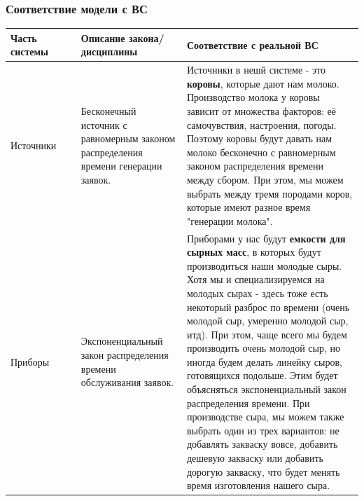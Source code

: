 \documentclass[a4paper, 14pt]{article}
\begin{document}
\subsubsection{Соответствие модели с ВС}

\begin{center}
	\begin{tabular}{|p{0.2\linewidth} | p{0.3\linewidth}| p{0.5\linewidth}|}
		\hline
		Часть системы      & Описание закона/дисциплины                                                           & Соответствие с реальной ВС                                                                                                                                                                                                                                                                                                                                                                                                                                                                                                                                                                                                                                     \\
		\hline
		Источники          & Бесконечный источник с равномерным законом распределения времени генерации заявок.   & Источники в нешй системе - это \textbf{коровы}, которые дают нам молоко. Производство молока у коровы зависит от множества факторов: её самочувствия, настроения, погоды. Поэтому коровы будут давать нам молоко бесконечно с равномерным законом распределения времени между сбором. При этом, мы можем выбрать между тремя породами коров, которые имеют разное время "генерации молока".                                                                                                                                                                                                                                                                    \\
		\hline
		Приборы            & Экспоненциальный закон распределения времени обслуживания заявок.                    & Приборами у нас будут \textbf{емкости для сырных масс}, в которых будут производиться наши молодые сыры. Хотя мы и специализируемся на молодых сырах - здесь тоже есть некоторый разброс по времени (очень молодой сыр, умеренно молодой сыр, итд). При этом, чаще всего мы будем производить очень молодой сыр, но иногда будем делать линейку сыров, готовящихся подольше. Этим будет объясняться экспоненциальный закон распределения времени. При производстве сыра, мы можем также выбрать один из трех вариантов: не добавлять закваску вовсе, добавить дешевую закваску или добавить дорогую закваску, что будет менять время изготовления нашего сыра. \\

\end{tabular}
\end{center}
\end{document}
